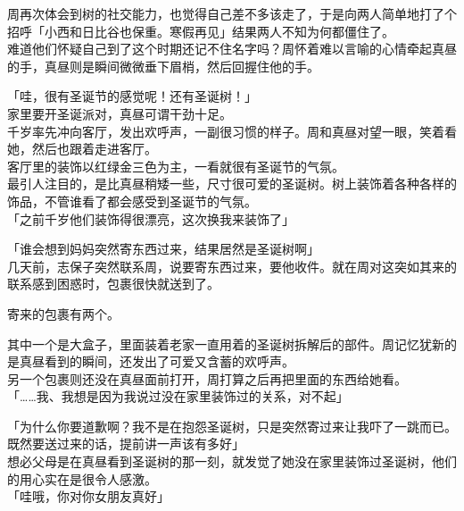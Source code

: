 周再次体会到树的社交能力，也觉得自己差不多该走了，于是向两人简单地打了个招呼「小西和日比谷也保重。寒假再见」结果两人不知为何都僵住了。\\

难道他们怀疑自己到了这个时期还记不住名字吗？周怀着难以言喻的心情牵起真昼的手，真昼则是瞬间微微垂下眉梢，然后回握住他的手。\\

\vspace{2\baselineskip}

「哇，很有圣诞节的感觉呢！还有圣诞树！」\\

家里要开圣诞派对，真昼可谓干劲十足。\\

千岁率先冲向客厅，发出欢呼声，一副很习惯的样子。周和真昼对望一眼，笑着看她，然后也跟着走进客厅。\\

客厅里的装饰以红绿金三色为主，一看就很有圣诞节的气氛。\\

最引人注目的，是比真昼稍矮一些，尺寸很可爱的圣诞树。树上装饰着各种各样的饰品，不管谁看了都会感受到圣诞节的气氛。\\

「之前千岁他们装饰得很漂亮，这次换我来装饰了」

「谁会想到妈妈突然寄东西过来，结果居然是圣诞树啊」\\

几天前，志保子突然联系周，说要寄东西过来，要他收件。就在周对这突如其来的联系感到困惑时，包裹很快就送到了。

寄来的包裹有两个。

其中一个是大盒子，里面装着老家一直用着的圣诞树拆解后的部件。周记忆犹新的是真昼看到的瞬间，还发出了可爱又含蓄的欢呼声。\\

另一个包裹则还没在真昼面前打开，周打算之后再把里面的东西给她看。\\

「……我、我想是因为我说过没在家里装饰过的关系，对不起」

「为什么你要道歉啊？我不是在抱怨圣诞树，只是突然寄过来让我吓了一跳而已。既然要送过来的话，提前讲一声该有多好」\\

想必父母是在真昼看到圣诞树的那一刻，就发觉了她没在家里装饰过圣诞树，他们的用心实在是很令人感激。\\

「哇哦，你对你女朋友真好」

